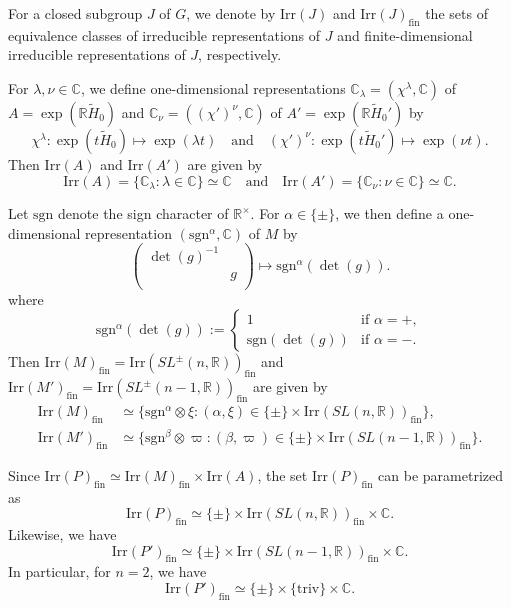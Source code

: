 \documentclass[reqno,11pt]{amsart}
\theoremstyle{remark}
\theoremstyle{definition}
\numberwithin{equation}{section}
\newcommand{\ga}{\alpha}
\newcommand{\R}{\mathbb{R}}
\newcommand{\C}{\mathbb{C}}
\newcommand{\Irr}{\mathrm{Irr}}
\newcommand{\triv}{\mathrm{triv}}
\newcommand{\fin}{\mathrm{fin}}
\newcommand{\wH}{\widetilde{H}}
\newcommand{\sgn}{\mathrm{sgn}}
\begin{document}

For a closed subgroup $J$ of $G$, we denote by $\Irr(J)$ and $\Irr(J)_{\fin}$
the sets of equivalence classes of irreducible representations of $J$  and 
finite-dimensional irreducible representations of $J$, respectively.

For $\lambda,\nu \in \C$, 
we define one-dimensional representations 
$\C_\lambda=(\chi^\lambda, \C)$ of $A=\exp(\R\wH_0)$ 
and
$\C_\nu = ((\chi')^\nu,\C)$ of $A' = \exp(\R \wH_0')$  by
\begin{equation}\label{eqn:chi}
\chi^\lambda \colon \exp(t \wH_0) \longmapsto \exp(\lambda t)
\quad
\text{and}
\quad
(\chi')^\nu \colon \exp(t \wH_0') \longmapsto \exp(\nu t).
\end{equation}
Then $\Irr(A)$ and $\Irr(A')$ are given by
\begin{equation*}
\Irr(A)=\{\C_\lambda : \lambda \in \C\} \simeq \C
\quad
\text{and}
\quad
\Irr(A')=\{\C_\nu : \nu \in \C\} \simeq \C.
\end{equation*}

Let  $\sgn$ denote the sign character of $\R^{\times}$.
For $\alpha \in \{\pm\}$, we then define a one-dimensional representation 
$(\sgn^\ga, \C)$ of $M$  by
\begin{equation}\label{eqn:20241106}
\begin{pmatrix}
\det(g)^{-1} &\\
& g\\
\end{pmatrix}
\longmapsto
\sgn^\alpha(\det(g)).
\end{equation}
where
\begin{equation}\label{eqn:20241108}
\sgn^\alpha(\det(g)) 
:= 
\begin{cases}
1 & \text{if $\alpha=+$},\\
\sgn(\det(g)) & \text{if $\alpha=-$}.
\end{cases}
\end{equation}
Then 
$\Irr(M)_\fin = \Irr(SL^{\pm}(n,\R))_\fin$
and
$\Irr(M')_\fin = \Irr(SL^{\pm}(n-1,\R))_\fin$
are given by
\begin{align*}
\Irr(M)_{\fin}&\simeq
\{\sgn^\ga \otimes \xi: 
(\alpha, \xi) \in \{\pm\} \times \Irr(SL(n,\R))_{\fin}\},\\
\Irr(M')_{\fin}&\simeq
\{\sgn^\beta \otimes \varpi: 
(\beta, \varpi) \in \{\pm\} \times \Irr(SL(n-1,\R))_{\fin}\}.
\end{align*}

Since 
$\Irr(P)_{\fin}\simeq \Irr(M)_{\fin} \times \Irr(A)$, the set $\Irr(P)_\fin$ can be 
parametrized as
\begin{equation*}
\Irr(P)_{\fin}\simeq 
\{\pm\} \times \Irr(SL(n,\R))_{\fin} \times \C.
\end{equation*}
Likewise, we have
\begin{equation*}
\Irr(P')_{\fin}\simeq 
\{\pm\} \times \Irr(SL(n-1,\R))_{\fin} \times \C.
\end{equation*}
In particular,
for $n=2$, we  have 
\begin{equation}\label{eqn:n2}
\Irr(P')_{\fin}\simeq 
\{\pm\} \times \{\triv\} \times \C.
\end{equation}
\end{document}
